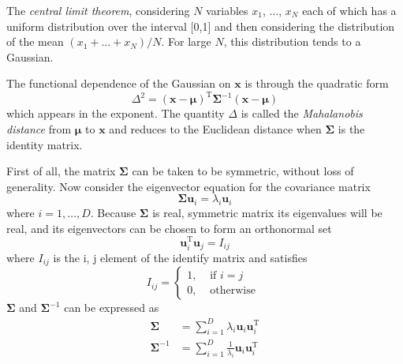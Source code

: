 \documentclass[5p,sort&compress]{elsarticle}
\begin{document}
The \textit{central limit theorem}, considering $N$ variables $x_1$, $\ldots$, $x_N$ each of which has a uniform distribution over the interval [0,1] and then considering the distribution of the mean $(x_1 + \ldots + x_N)/N$. For large $N$, this distribution tends to a Gaussian.

The functional dependence of the Gaussian on $\boldsymbol{x}$ is through the quadratic form
\begin{equation}
\Delta^{2}=(\mathbf{x}-\boldsymbol{\mu})^{\mathrm{T}} \mathbf{\Sigma}^{-1}(\mathbf{x}-\boldsymbol{\mu})
\end{equation}
which appears in the exponent. The quantity $\Delta$ is called the \textit{Mahalanobis distance} from $\boldsymbol{\mu}$ to $\boldsymbol{x}$ and reduces to the Euclidean distance when $\mathbf{\Sigma}$ is the identity matrix.

First of all, the matrix $\mathbf{\Sigma}$ can be taken to be symmetric, without loss of generality. Now consider the eigenvector equation for the covariance matrix
\begin{equation}
\boldsymbol{\Sigma} \mathbf{u}_{i}=\lambda_{i} \mathbf{u}_{i}
\end{equation}
where $i = 1, \ldots, D$. Because $\mathbf{\Sigma}$ is real, symmetric matrix its eigenvalues will be real, and its eigenvectors can be chosen to form an orthonormal set
\begin{equation}
\mathbf{u}_{i}^{\mathrm{T}} \mathbf{u}_{j}=I_{i j}
\end{equation}
where $I_{ij}$ is the i, j element of the identify matrix and satisfies
\begin{equation}
I_{i j}=\left\{\begin{array}{ll}{1,} & {\text { if } i=j} \\ {0,} & {\text { otherwise }}\end{array}\right.
\end{equation}
$\mathbf{\Sigma}$ and $\mathbf{\Sigma}^{-1}$ can be expressed as
\begin{equation}
\begin{aligned} \boldsymbol{\Sigma} &=\sum_{i=1}^{D} \lambda_{i} \mathbf{u}_{i} \mathbf{u}_{i}^{\mathrm{T}} \\
\boldsymbol{\Sigma}^{-1} &=\sum_{i=1}^{D} \frac{1}{\lambda_{i}} \mathbf{u}_{i} \mathbf{u}_{i}^{\mathrm{T}} \end{aligned}
\end{equation}
\end{document}
